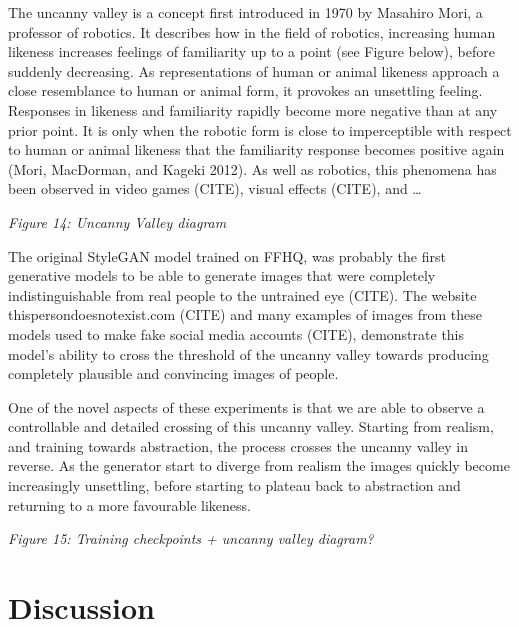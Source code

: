 The uncanny valley is a concept first introduced in 1970 by Masahiro Mori, a professor of robotics. 
It describes how in the field of robotics, increasing human likeness increases feelings of familiarity up to a point (see Figure below), before suddenly decreasing. 
As representations of human or animal likeness approach a close resemblance to human or animal form, it provokes an unsettling feeling. 
Responses in likeness and familiarity rapidly become more negative than at any prior point. 
It is only when the robotic form is close to imperceptible with respect to human or animal likeness that the familiarity response becomes positive again (Mori, MacDorman, and Kageki 2012). 
As well as robotics, this phenomena has been observed in video games (CITE), visual effects (CITE), and …

\textit{Figure 14: Uncanny Valley diagram}

The original StyleGAN model trained on FFHQ, was probably the first generative models to be able to generate images that were completely indistinguishable from real people to the untrained eye (CITE). 
The website thispersondoesnotexist.com (CITE) and many examples of images from these models used to make fake social media accounts (CITE), demonstrate this model's ability to cross the threshold of the uncanny valley towards producing completely plausible and convincing images of people.

One of the novel aspects of these experiments is that we are able to observe a controllable and detailed crossing of this uncanny valley. 
Starting from realism, and training towards abstraction, the process crosses the uncanny valley in reverse. 
As the generator start to diverge from realism the images quickly become increasingly unsettling, before starting to plateau back to abstraction and returning to a more favourable likeness.

\textit{Figure 15: Training checkpoints + uncanny valley diagram?}

\section{Discussion}

